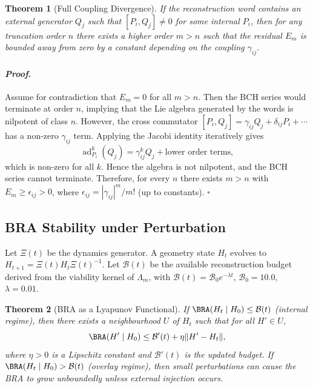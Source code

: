 \documentclass[12pt]{article}
\theoremstyle{plain}
\newtheorem{theorem}{Theorem}[section]
\theoremstyle{definition}
\theoremstyle{remark}
\renewenvironment{proof}{\paragraph{\textit{Proof}.}}{\hfill$\square$}
\begin{document}
\begin{theorem}[Full Coupling Divergence]
\statuslean
If the reconstruction word contains an external generator $Q_j$ such that $[P_i, Q_j] \neq 0$ for some internal $P_i$, then for any truncation order $n$ there exists a higher order $m > n$ such that the residual $E_m$ is bounded away from zero by a constant depending on the coupling $\gamma_{ij}$.
\end{theorem}

\begin{proof}
Assume for contradiction that $E_m = 0$ for all $m > n$. Then the BCH series would terminate at order $n$, implying that the Lie algebra generated by the words is nilpotent of class $n$. However, the cross commutator $[P_i, Q_j] = \gamma_{ij} Q_j + \delta_{ij} P_i + \cdots$ has a non-zero $\gamma_{ij}$ term. Applying the Jacobi identity iteratively gives
\[
\operatorname{ad}_{P_i}^k (Q_j) = \gamma_{ij}^k Q_j + \text{lower order terms},
\]
which is non-zero for all $k$. Hence the algebra is not nilpotent, and the BCH series cannot terminate. Therefore, for every $n$ there exists $m > n$ with $E_m \ge \epsilon_{ij} > 0$, where $\epsilon_{ij} = |\gamma_{ij}|^m / m!$ (up to constants). 
\end{proof}

\subsection{BRA Stability under Perturbation}

Let $\Xi(t)$ be the dynamics generator. A geometry state $H_t$ evolves to $H_{t+1} = \Xi(t) H_t \Xi(t)^{-1}$. Let $\mathcal{B}(t)$ be the available reconstruction budget derived from the viability kernel of $\Lambda_m$, with $\mathcal{B}(t) = \mathcal{B}_0 e^{-\lambda t}$, $\mathcal{B}_0=10.0$, $\lambda=0.01$.

\begin{theorem}[BRA as a Lyapunov Functional]
\statusthm
If $\BRA(H_t \mid H_0) \le \mathcal{B}(t)$ (internal regime), then there exists a neighbourhood $U$ of $H_t$ such that for all $H' \in U$,
\[
\BRA(H' \mid H_0) \le \mathcal{B}'(t) + \eta \|H' - H_t\|,
\]
where $\eta > 0$ is a Lipschitz constant and $\mathcal{B}'(t)$ is the updated budget. If $\BRA(H_t \mid H_0) > \mathcal{B}(t)$ (overlay regime), then small perturbations can cause the BRA to grow unboundedly unless external injection occurs.
\end{theorem}
\end{document}
